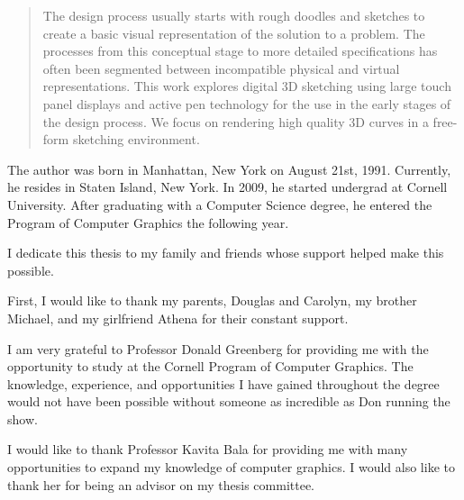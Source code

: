 \begin{abstract}
The design process usually starts with rough doodles and sketches to create a basic visual representation of the solution to a problem. The processes from this conceptual stage to more detailed specifications has often been segmented between incompatible physical and virtual representations. This work explores digital 3D sketching using large touch panel displays and active pen technology for the use in the early stages of the design process. We focus on rendering high quality 3D curves in a free-form sketching environment.
\end{abstract}

\begin{biosketch}
The author was born in Manhattan, New York on August 21st, 1991. Currently, he resides in Staten Island, New York. In 2009, he started undergrad at Cornell University. After graduating with a Computer Science degree, he entered the Program of Computer Graphics the following year.
\end{biosketch}

\begin{dedication}
I dedicate this thesis to my family and friends whose support helped make this possible.
\end{dedication}

\begin{acknowledgements}
First, I would like to thank my parents, Douglas and Carolyn, my brother Michael, and my girlfriend Athena for their constant support.

I am very grateful to Professor Donald Greenberg for providing me with the opportunity to study at the Cornell Program of Computer Graphics. The knowledge, experience, and opportunities I have gained throughout the degree would not have been possible without someone as incredible as Don running the show.

I would like to thank Professor Kavita Bala for providing me with many opportunities to expand my knowledge of computer graphics. I would also like to thank her for being an advisor on my thesis committee.
\end{acknowledgements}
